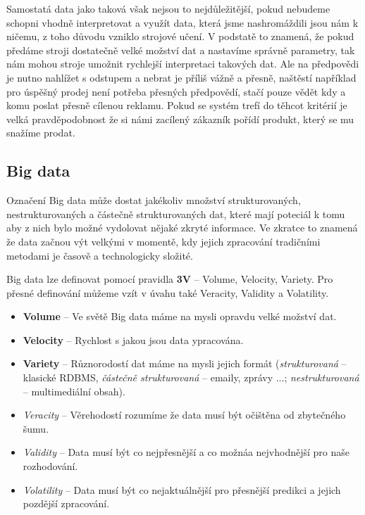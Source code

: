 \par Samostatá data jako taková však nejsou to nejdůležitější, pokud nebudeme schopni vhodně interpretovat a využít data, která jsme nashromáždili jsou nám k ničemu, z toho důvodu vzniklo strojové učení. V podstatě to znamená, že pokud předáme stroji dostatečně velké možství dat a nastavíme správně parametry, tak nám mohou stroje umožnit rychlejší interpretaci takových dat. Ale na předpovědi je nutno nahlížet s odstupem a nebrat je příliš vážně a přesně, naštěstí například pro úspěšný prodej není potřeba přesných předpovědí, stačí pouze vědět kdy a komu poslat přesně cílenou reklamu. Pokud se systém trefí do těhcot kritérií je velká pravděpodobnost že si námi zacílený zákazník pořídí produkt, který se mu snažíme prodat. \cite{predictive-analytics}

\subsection{Big data}
Označení Big data může dostat jakékoliv množství strukturovaných, nestrukturovaných a částečně strukturovaných dat, které mají poteciál k tomu aby z nich bylo možné vydolovat nějaké zkryté informace. Ve zkratce to znamená že data začnou výt velkými v momentě, kdy jejich zpracování tradičními metodami je časově a technologicky složité.\cite{big-data-anayitics}

\par Big data lze definovat pomocí pravidla \textbf{3V} -- Volume, Velocity, Variety. Pro přesné definování můžeme vzít v úvahu také Veracity, Validity a Volatility.\cite{big-data-anayitics}
\begin{itemize}
  \item \textbf{Volume} -- Ve světě Big data máme na mysli opravdu velké možství dat.
  \item \textbf{Velocity} -- Rychlost s jakou jsou data ypracována.
  \item \textbf{Variety} -- Různorodostí dat máme na mysli jejich formát (\textit{strukturovaná} -- klasické RDBMS, \textit{částečně strukturovaná} -- emaily, zprávy ...; \textit{nestrukturovaná} -- multimediální obsah).
  \item \textit{Veracity} -- Věrehodostí rozumíme že data musí být očištěna od zbytečného šumu.
  \item \textit{Validity} -- Data musí být co nejpřesnější a co možnáa nejvhodnější pro naše rozhodování.
  \item \textit{Volatility} -- Data musí být co nejaktuálnější pro přesnější predikci a jejich pozdější zpracování. \cite{big-data-anayitics}
\end{itemize}

